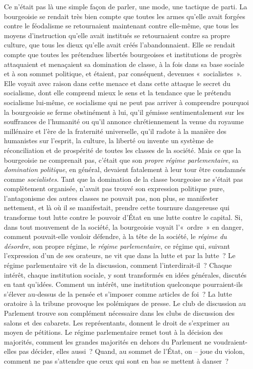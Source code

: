\documentclass[french,twoside]{book} %
\begin{document}
Ce n’était pas là une simple façon de parler, une mode, une tactique de parti. La bourgeoisie se rendait très bien compte que toutes les armes qu’elle avait forgées contre le féodalisme se retournaient maintenant contre elle-même, que tous les moyens d’instruction qu’elle avait institués se retournaient contre sa propre culture, que tous les dieux qu’elle avait créés l’abandonnaient. Elle se rendait compte que toutes les prétendues libertés bourgeoises et institutions de progrès attaquaient et menaçaient sa domination de classe, à la fois dans sa base sociale et à son sommet politique, et étaient, par conséquent, devenues « socialistes ». Elle voyait avec raison dans cette menace et dans cette attaque le secret du socialisme, dont elle comprend mieux le sens et la tendance que le prétendu socialisme lui-même, ce socialisme qui ne peut pas arriver à comprendre pourquoi la bourgeoisie se ferme obstinément à lui, qu’il gémisse sentimentalement sur les souffrances de l’humanité ou qu’il annonce chrétiennement la venue du royaume millénaire et l’ère de la fraternité universelle, qu’il radote à la manière des humanistes sur l’esprit, la culture, la liberté ou invente un système de réconciliation et de prospérité de toutes les classes de la société. Mais ce que la bourgeoisie ne comprenait pas, c’était que son \emph{propre régime parlementaire}, sa \emph{domination politique}, en général, devaient fatalement à leur tour être condamnés comme \emph{socialistes}. Tant que la domination de la classe bourgeoise ne s’était pas complètement organisée, n’avait pas trouvé son expression politique pure, l’antagonisme des autres classes ne pouvait pas, non plus, se manifester nettement, et là où il se manifestait, prendre cette tournure dangereuse qui transforme tout lutte contre le pouvoir d’État en une lutte contre le capital. Si, dans tout mouvement de la société, la bourgeoisie voyait l’« ordre » en danger, comment pouvait-elle vouloir défendre, à la tête de la société, le \emph{régime du désordre}, son propre régime, le \emph{régime parlementaire}, ce régime qui, suivant l’expression d’un de ses orateurs, ne vit que dans la lutte et par la lutte ? Le régime parlementaire vit de la discussion, comment l’interdirait-il ? Chaque intérêt, chaque institution sociale, y sont transformés en idées générales, discutés en tant qu’idées. Comment un intérêt, une institution quelconque pourraient-ils s’élever au-dessus de la pensée et s’imposer comme articles de foi ? La lutte oratoire à la tribune provoque les polémiques de presse. Le club de discussion au Parlement trouve son complément nécessaire dans les clubs de discussion des salons et des cabarets. Les représentants, donnent le droit de s’exprimer au moyen de pétitions. Le régime parlementaire remet tout à la décision des majorités, comment les grandes majorités en dehors du Parlement ne voudraient-elles pas décider, elles aussi ? Quand, au sommet de l’État, on – joue du violon, comment ne pas s’attendre que ceux qui sont en bas se mettent à danser ?\par
\end{document}
